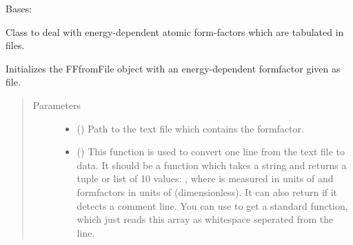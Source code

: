 \documentclass[letterpaper,10pt,english]{sphinxmanual}
\begin{document}
\begin{fulllineitems}
\label{\detokenize{modules-api/samplerepresentation:SampleRepresentation.FFfromFile}}
Bases: {\hyperref[\detokenize{modules-api/samplerepresentation:SampleRepresentation.Formfactor}]{}}

Class to deal with energy-dependent atomic form-factors which are tabulated in files.

\begin{fulllineitems}
\label{\detokenize{modules-api/samplerepresentation:SampleRepresentation.FFfromFile.__init__}}
Initializes the FFfromFile object with an energy-dependent formfactor given as file.
\begin{quote}\begin{description}
\item[{Parameters}] \leavevmode\begin{itemize}
\item {} 
 () \textendash{} Path to the text file which contains the formfactor.

\item {} 
 () \textendash{} This function is used to convert one line from the text file to data.
It should be a function which takes a string and returns a tuple or list of 10 values: ,
where  is measured in units of  and formfactors in units of  (dimensionless).
It can also return  if it detects a comment line.
You can use {\hyperref[\detokenize{modules-api/samplerepresentation:SampleRepresentation.FFfromFile.createLinereader}]{}} to get a standard function, which just reads this array as whitespace seperated from the line.


\end{itemize}
\end{description}
\end{quote}
\end{fulllineitems}
\end{fulllineitems}
\end{document}

